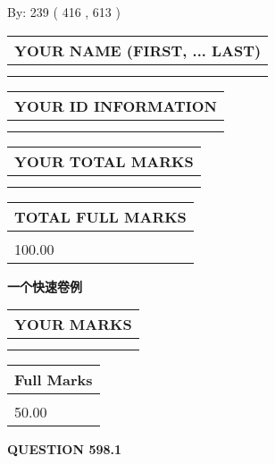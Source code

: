 \documentclass{ctexart}
\begin{document}
   
\hspace{1.0in} By: 
 239 ( 416 ,  613 )
   
   
   
   
\newpage 
\setcounter{page}{ 
   598001 } 
   
   
   
   
\noindent\begin{tabular}{|l|}
\hline
YOUR NAME (FIRST, ... LAST)  \\
\hline
 \\ 
 \\ 
\hline
\end{tabular}
\hspace{0.05in} \begin{tabular}{|l|}
\hline
 YOUR   ID   INFORMATION  \\
\hline
 \\ 
 \\ 
\hline
\end{tabular}
   
   
\vspace{0.2in}\noindent\begin{tabular}{|l|}
\hline
YOUR TOTAL MARKS  \\
\hline
 \\ 
 \\ 
\hline
\end{tabular}
\hspace{0.05in} \begin{tabular}{|l|}
\hline
TOTAL FULL MARKS  \\
\hline
 \\ 
100.00 \\
\hline
\end{tabular}
   
   
 \vspace{0.2in}
{\LARGE {\textbf{ 一个快速卷例}}}
   
   
  
\vspace{0.2in}
  
\noindent\begin{tabular}{|l|}
\hline
 YOUR MARKS  \\
\hline
 \\ 
 \\ 
\hline
\end{tabular}
\hspace{0.05in} \begin{tabular}{|l|}
\hline
 Full Marks  \\
\hline
 \\ 
50.00 \\
\hline
\end{tabular}
{\textbf{\Large{QUESTION
598.1 
}}}
  
\end{document}
